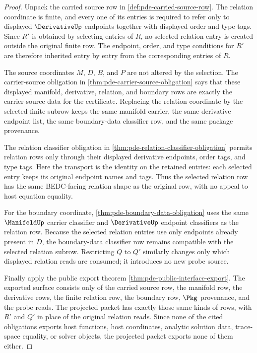 \begin{proof}
Unpack the carried source row in \autoref{def:pde-carried-source-row}. The relation coordinate is finite, and every one of its entries is required to refer only to displayed $\DerivativeUp$ endpoints together with displayed order and type tags. Since $R'$ is obtained by selecting entries of $R$, no selected relation entry is created outside the original finite row. The endpoint, order, and type conditions for $R'$ are therefore inherited entry by entry from the corresponding entries of $R$.

The source coordinates $M$, $D$, $B$, and $P$ are not altered by the selection. The carrier-source obligation in \autoref{thm:pde-carrier-source-obligation} says that these displayed manifold, derivative, relation, and boundary rows are exactly the carrier-source data for the certificate. Replacing the relation coordinate by the selected finite subrow keeps the same manifold carrier, the same derivative endpoint list, the same boundary-data classifier row, and the same package provenance.

The relation classifier obligation in \autoref{thm:pde-relation-classifier-obligation} permits relation rows only through their displayed derivative endpoints, order tags, and type tags. Here the transport is the identity on the retained entries: each selected entry keeps its original endpoint names and tags. Thus the selected relation row has the same BEDC-facing relation shape as the original row, with no appeal to host equation equality.

For the boundary coordinate, \autoref{thm:pde-boundary-data-obligation} uses the same $\ManifoldUp$ carrier classifier and $\DerivativeUp$ endpoint classifiers as the relation row. Because the selected relation entries use only endpoints already present in $D$, the boundary-data classifier row remains compatible with the selected relation subrow. Restricting $Q$ to $Q'$ similarly changes only which displayed relation reads are consumed; it introduces no new probe source.

Finally apply the public export theorem \autoref{thm:pde-public-interface-export}. The exported surface consists only of the carried source row, the manifold row, the derivative rows, the finite relation row, the boundary row, $\Pkg$ provenance, and the probe reads. The projected packet has exactly those same kinds of rows, with $R'$ and $Q'$ in place of the original relation reads. Since none of the cited obligations exports host functions, host coordinates, analytic solution data, trace-space equality, or solver objects, the projected packet exports none of them either.
\end{proof}
